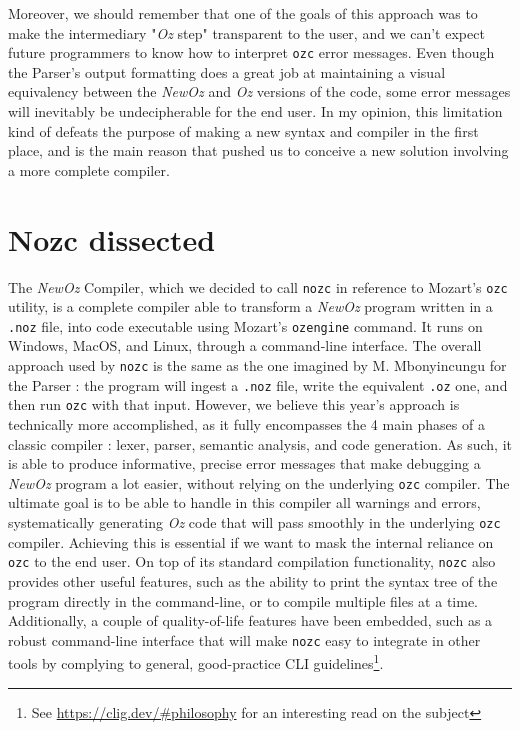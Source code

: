 Moreover, we should remember that one of the goals of this approach was to make the intermediary "\textit{Oz} step" transparent to the user, and we can't expect future programmers to know how to interpret \texttt{ozc} error messages.
Even though the Parser's output formatting does a great job at maintaining a visual equivalency between the \textit{NewOz} and \textit{Oz} versions of the code, some error messages will inevitably be undecipherable for the end user.
In my opinion, this limitation kind of defeats the purpose of making a new syntax and compiler in the first place, and is the main reason that pushed us to conceive a new solution involving a more complete compiler.

\section{Nozc dissected}\label{sec:ch3-nozc}
The \textit{NewOz} Compiler\cite{NozcGitHub}, which we decided to call \texttt{nozc} in reference to Mozart's \texttt{ozc} utility, is a complete compiler able to transform a \textit{NewOz} program written in a \texttt{.noz} file, into code executable using Mozart's \texttt{ozengine} command.
It runs on Windows, MacOS, and Linux, through a command-line interface.
The overall approach used by \texttt{nozc} is the same as the one imagined by M. Mbonyincungu for the Parser : the program will ingest a \texttt{.noz} file, write the equivalent \texttt{.oz} one, and then run \texttt{ozc} with that input.
However, we believe this year's approach is technically more accomplished, as it fully encompasses the 4 main phases of a classic compiler : lexer, parser, semantic analysis, and code generation.
As such, it is able to produce informative, precise error messages that make debugging a \textit{NewOz} program a lot easier, without relying on the underlying \texttt{ozc} compiler.
The ultimate goal is to be able to handle in this compiler all warnings and errors, systematically generating \textit{Oz} code that will pass smoothly in the underlying \texttt{ozc} compiler.
Achieving this is essential if we want to mask the internal reliance on \texttt{ozc} to the end user.\newline
On top of its standard compilation functionality, \texttt{nozc} also provides other useful features, such as the ability to print the syntax tree of the program directly in the command-line, or to compile multiple files at a time.
Additionally, a couple of quality-of-life features have been embedded, such as a robust command-line interface that will make \texttt{nozc} easy to integrate in other tools by complying to general, good-practice CLI guidelines\footnote{See \url{https://clig.dev/\#philosophy} for an interesting read on the subject}.
